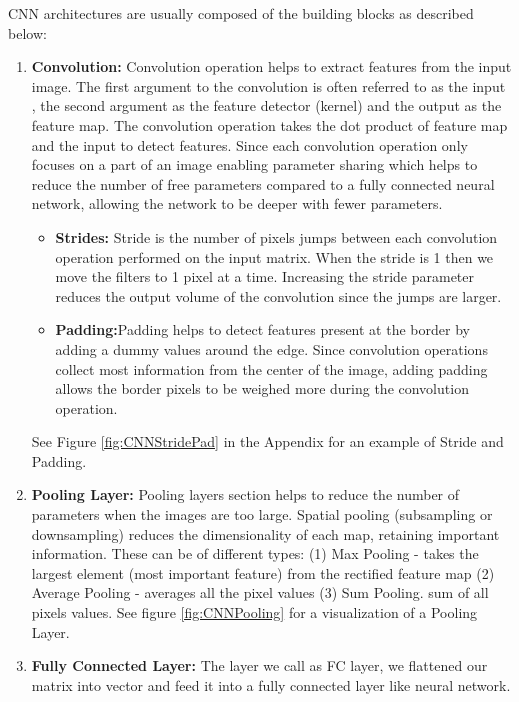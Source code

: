 \documentclass[11pt]{article}
\begin{document}
CNN architectures are usually composed of the building blocks as described
below:

\begin{enumerate}
\item \textbf{Convolution:} Convolution operation helps to extract features
  from the input image. The ﬁrst argument to the convolution is often referred
  to as the input , the second argument as the feature detector (kernel) and
  the output as the feature map. The convolution operation takes the dot
  product of feature map and the input to detect features. Since each
  convolution operation only focuses on a part of an image enabling parameter
  sharing which helps to reduce the number of free parameters compared to a
  fully connected neural network, allowing the network to be deeper with
  fewer parameters.

  \begin{itemize}
  \item \textbf{Strides:} Stride is the number of pixels jumps between
    each convolution operation performed on the input matrix. When the stride
    is 1 then we move the filters to 1 pixel at a time. Increasing the stride
    parameter reduces the output volume of the convolution since the jumps
    are larger.
  \item \textbf{Padding:}Padding helps to detect features present at the
    border by adding a dummy values around the edge. Since convolution
    operations collect most information from the center of the image, adding
    padding allows the border pixels to be weighed more during the convolution
    operation.
  \end{itemize}

  See Figure \ref{fig:CNNStridePad} in the Appendix for an example of Stride
  and Padding.

\item \textbf{Pooling Layer:} Pooling layers section helps to reduce the
  number of parameters when the images are too large. Spatial pooling
  (subsampling or downsampling) reduces the dimensionality of each map,
  retaining important information. These can be of different types:
  (1) Max Pooling - takes the largest element (most important feature)
  from the rectified feature map (2) Average Pooling - averages all the
  pixel values (3) Sum Pooling. sum of all pixels values. See figure
  \ref{fig:CNNPooling} for a visualization of a Pooling Layer.

\item \textbf{Fully Connected Layer:} The layer we call as FC layer, we
  flattened our matrix into vector and feed it into a fully connected layer
  like neural network.
  \end{enumerate}
\end{document}
